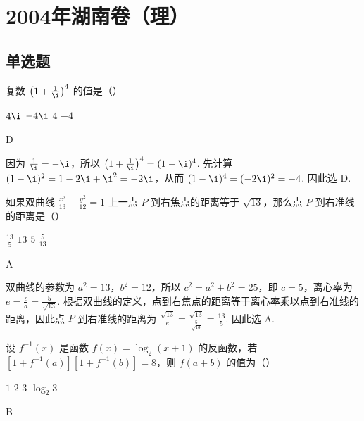\chapter{2004年湖南卷（理）}
\section{单选题}
\begin{problem}
复数 \(\left(1 + \frac{1}{\i}\right)^4\) 的值是（\quad）

\choices
    {\(4\i\)}
    {\(-4\i\)}
    {\(4\)}
    {\(-4\)}
\end{problem}

\begin{answer}
D
\end{answer}

\begin{solution}
因为 \(\frac{1}{\i}=-\i\)，所以
\(\left(1+\frac{1}{\i}\right)^4=(1-\i)^4\). 先计算
\((1-\i)^2=1-2\i+\i^2=-2\i\)，从而
\((1-\i)^4=(-2\i)^2=-4\). 因此选 D.
\end{solution}

\begin{problem}
如果双曲线 \(\frac{x^2}{13} - \frac{y^2}{12} = 1\) 上一点 \(P\) 到右焦点的距离等于 \(\sqrt{13}\)，那么点 \(P\) 到右准线的距离是（\quad）

\choices
    {\(\frac{13}{5}\)}
    {\(13\)}
    {\(5\)}
    {\(\frac{5}{13}\)}
\end{problem}

\begin{answer}
A
\end{answer}

\begin{solution}
双曲线的参数为 \(a^2=13\)，\(b^2=12\)，所以
\(c^2=a^2+b^2=25\)，即 \(c=5\)，离心率为
\(e=\frac{c}{a}=\frac{5}{\sqrt{13}}\). 根据双曲线的定义，点到右焦点的距离等于离心率乘以点到右准线的距离，因此点 \(P\) 到右准线的距离为
\(\frac{\sqrt{13}}{e}=\frac{\sqrt{13}}{\frac{5}{\sqrt{13}}}=\frac{13}{5}\). 因此选 A.
\end{solution}

\begin{problem}
设 \(f^{-1}(x)\) 是函数 \(f(x)=\log_{2}(x+1)\) 的反函数，若 \(\left[1+f^{-1}(a)\right]\left[1+f^{-1}(b)\right]=8\)，则 \(f(a+b)\) 的值为（\quad）

\choices
    {\(1\)}
    {\(2\)}
    {\(3\)}
    {\(\log_{2}3\)}
\end{problem}

\begin{answer}
B
\end{answer}

